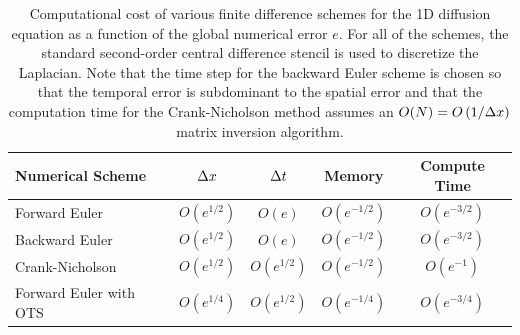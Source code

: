 \documentclass[fleqn,12pt,twoside]{article}
\begin{document}
\begin{table}[tb]
\caption{
Computational cost of various finite difference schemes for the 1D 
diffusion equation as a function of the global numerical error $e$.
For all of the schemes, the standard second-order central difference 
stencil is used to discretize the Laplacian.  
Note that the time step for the backward Euler scheme is chosen so that the
temporal error is subdominant to the spatial error and that the computation 
time for the Crank-Nicholson method assumes an $O(N) = O \left( 1/\Delta x\right)$ 
matrix inversion algorithm. 
}
\label{tab:comp_perf_vs_err} 
\renewcommand{\arraystretch}{1.5}
\begin{tabular}{lcccc}
  \hline
  {\bf Numerical Scheme} & $\Delta x$ 
  & $\Delta t$
  & {\bf Memory}
  & {\bf Compute Time}
  \\
  \hline 
  Forward Euler    & $O\left( e^{1/2} \right)$ 
                   & $O\left( e \right)$ 
                   & $O\left( e^{-1/2} \right)$ 
                   & $O\left( e^{-3/2} \right)$ \\
  Backward Euler   & $O\left( e^{1/2} \right)$ 
                   & $O\left( e \right)$ 
                   & $O\left( e^{-1/2} \right)$ 
                   & $O\left( e^{-3/2} \right)$ \\
  Crank-Nicholson  & $O\left( e^{1/2} \right)$ 
                   & $O\left( e^{1/2} \right)$ 
                   & $O\left( e^{-1/2} \right)$ 
                   & $O\left( e^{-1} \right)$ \\
  Forward Euler with OTS  & $O\left( e^{1/4} \right)$ 
                   & $O\left( e^{1/2} \right)$ 
                   & $O\left( e^{-1/4} \right)$ 
                   & $O\left( e^{-3/4} \right)$ \\ 
  \hline
\end{tabular}
\end{table}
\end{document}
